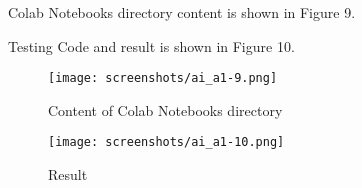 \documentclass{article}
\begin{document}
Colab Notebooks directory content is shown in Figure 9.

Testing Code and result is shown in Figure 10.




\begin{figure}
\centering
\texttt{[image: screenshots/ai\_a1-9.png]}
\caption{\label{fig:python_code_read_files_produce_output}Content of Colab Notebooks directory}
\end{figure}


\begin{figure}
\centering
\texttt{[image: screenshots/ai\_a1-10.png]}
\caption{\label{fig:python_code_read_files_produce_output}Result}
\end{figure}
\end{document}
